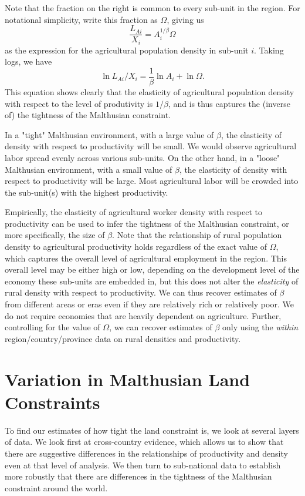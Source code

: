\documentclass[11pt]{article}
\begin{document}
Note that the fraction on the right is common to every sub-unit in the region. For notational simplicity, write this fraction as $\Omega$, giving us
\begin{equation}
\frac{L_{Ai}}{X_i} = A_{i}^{1/\beta} \Omega
\end{equation}
as the expression for the agricultural population density in sub-unit $i$. Taking logs, we have
\begin{equation}
\ln L_{Ai}/X_i = \frac{1}{\beta} \ln A_{i} + \ln \Omega. \label{EQ_est}
\end{equation}
This equation shows clearly that the elasticity of agricultural population density with respect to the level of produtivity is $1/\beta$, and is thus captures the (inverse of) the tightness of the Malthusian constraint.

In a "tight" Malthusian environment, with a large value of $\beta$, the elasticity of density with respect to productivity will be small. We would observe agricultural labor spread evenly across various sub-units. On the other hand, in a "loose" Malthusian environment, with a small value of $\beta$, the elasticity of density with respect to productivity will be large. Most agricultural labor will be crowded into the sub-unit(s) with the highest productivity.

Empirically, the elasticity of agricultural worker density with respect to productivity can be used to infer the tightness of the Malthusian constraint, or more specifically, the size of $\beta$. Note that the relationship of rural population density to agricultural productivity holds regardless of the exact value of $\Omega$, which captures the overall level of agricultural employment in the region. This overall level may be either high or low, depending on the development level of the economy these sub-units are embedded in, but this does not alter the \textit{elasticity} of rural density with respect to productivity. We can thus recover estimates of $\beta$ from different areas or eras even if they are relatively rich or relatively poor. We do not require economies that are heavily dependent on agriculture. Further, controlling for the value of $\Omega$, we can recover estimates of $\beta$ only using the \textit{within} region/country/province data on rural densities and productivity.

\section{Variation in Malthusian Land Constraints}
To find our estimates of how tight the land constraint is, we look at several layers of data. We look first at cross-country evidence, which allows us to show that there are suggestive differences in the relationships of productivity and density even at that level of analysis. We then turn to sub-national data to establish more robustly that there are differences in the tightness of the Malthusian constraint around the world.
\end{document}

